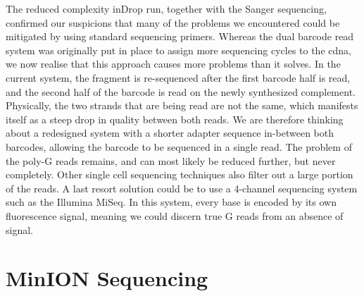 The reduced complexity inDrop run, together with the Sanger sequencing, confirmed our suspicions that many of the problems we encountered could be mitigated by using standard sequencing primers. Whereas the dual barcode read system was originally put in place to assign more sequencing cycles to the \acrshort{cdna}, we now realise that this approach causes more problems than it solves. In the current system, the fragment is re-sequenced after the first barcode half is read, and the second half of the barcode is read on the newly synthesized complement. Physically, the two strands that are being read are not the same, which manifests itself as a steep drop in quality between both reads. We are therefore thinking about a redesigned system with a shorter adapter sequence in-between both barcodes, allowing the barcode to be sequenced in a single read. The problem of the poly-G reads remains, and can most likely be reduced further, but never completely. Other single cell sequencing techniques also filter out a large portion of the reads. A last resort solution could be to use a 4-channel sequencing system such as the Illumina MiSeq. In this system, every base is encoded by its own fluorescence signal, meaning we could discern true G reads from an absence of signal.\pms

\newpage
\section{MinION Sequencing}
\label{sec:seq_minion}


